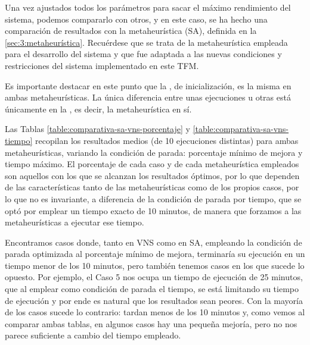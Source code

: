 Una vez ajustados todos los parámetros para sacar el máximo rendimiento del sistema, podemos compararlo con otros, y en este caso, se ha hecho una comparación de resultados con la metaheurística \sa{} (SA), definida en la \autoref{sec:3:metaheurística}. Recuérdese que se trata de la metaheurística empleada para el desarrollo del sistema \legacy{} y que fue adaptada a las nuevas condiciones y restricciones del sistema implementado en este TFM.

Es importante destacar en este punto que la \faseuno{}, de inicialización, es la misma en ambas metaheurísticas. La única diferencia entre unas ejecuciones u otras está únicamente en la \fasedos{}, es decir, la metaheurística en sí.

Las Tablas \ref{table:comparativa-sa-vns-porcentaje} y \ref{table:comparativa-sa-vns-tiempo} recopilan los resultados medios (de 10 ejecuciones distintas) para ambas metaheurísticas, variando la condición de parada: porcentaje mínimo de mejora y tiempo máximo. El porcentaje de cada caso y de cada metaheurística empleados son aquellos con los que se alcanzan los resultados óptimos, por lo que dependen de las características tanto de las metaheurísticas como de los propios casos, por lo que no es invariante, a diferencia de la condición de parada por tiempo, que se optó por emplear un tiempo exacto de 10 minutos, de manera que forzamos a las metaheurísticas a ejecutar ese tiempo. 

Encontramos casos donde, tanto en VNS como en SA, empleando la condición de parada optimizada al porcentaje mínimo de mejora, terminaría su ejecución en un tiempo menor de los 10 minutos, pero también tenemos casos en los que sucede lo opuesto. Por ejemplo, el Caso 5 nos ocupa un tiempo de ejecución de 25 minutos, que al emplear como condición de parada el tiempo, se está limitando su tiempo de ejecución y por ende es natural que los resultados sean peores. Con la mayoría de los casos sucede lo contrario: tardan menos de los 10 minutos y, como vemos al comparar ambas tablas, en algunos casos hay una pequeña mejoría, pero no nos parece suficiente a cambio del tiempo empleado.

